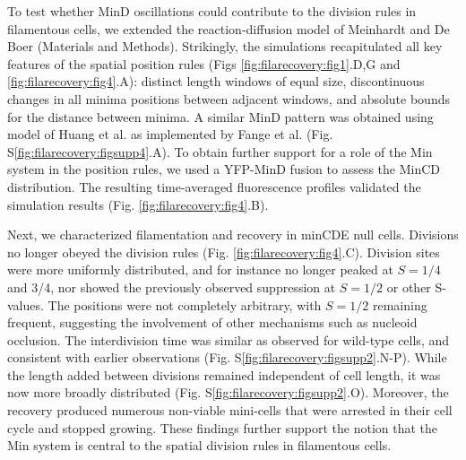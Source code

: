 To test whether MinD oscillations could contribute to the division rules in filamentous cells, we extended the reaction-diffusion model of Meinhardt and De Boer \cite{Meinhardt2001} (Materials and Methods). Strikingly, the simulations recapitulated all key features of the spatial position rules (Figs \ref{fig:filarecovery:fig1}.D,G and \ref{fig:filarecovery:fig4}.A): distinct length windows of equal size, discontinuous changes in all minima positions between adjacent windows, and absolute bounds for the distance between minima. A similar MinD pattern was obtained using model of Huang et al. \cite{Huang2003} as implemented by Fange et al. \cite{Hattne2005, Fange2006} (Fig. S\ref{fig:filarecovery:figsupp4}.A). To obtain further support for a role of the Min system in the position rules, we used a YFP-MinD fusion to assess the MinCD distribution. The resulting time-averaged fluorescence profiles validated the simulation results (Fig. \ref{fig:filarecovery:fig4}.B). 

Next, we characterized filamentation and recovery in minCDE null cells. Divisions no longer obeyed the division rules (Fig. \ref{fig:filarecovery:fig4}.C). Division sites were more uniformly distributed, and for instance no longer peaked at $S = 1/4$ and 3/4, nor showed the previously observed suppression at $S = 1/2$ or other S-values. The positions were not completely arbitrary, with $S = 1/2$ remaining frequent, suggesting the involvement of other mechanisms such as nucleoid occlusion. The interdivision time was similar as observed for wild-type cells, and consistent with earlier observations \cite{Donachie1996} (Fig. S\ref{fig:filarecovery:figsupp2}.N-P). While the length added between divisions remained independent of cell length, it was now more broadly distributed (Fig. S\ref{fig:filarecovery:figsupp2}.O). Moreover, the recovery produced numerous non-viable mini-cells \cite{Donachie1996, Adler1967} that were arrested in their cell cycle and stopped growing.  These findings further support the notion that the Min system is central to the spatial division rules in filamentous cells.

